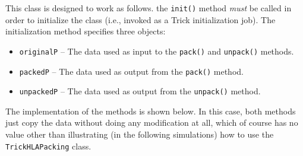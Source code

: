 This class is designed to work as follows.
the {\tt init()} method {\em must} be called in order to initialize the class
(i.e., invoked as a Trick initialization job).
The initialization method specifies three \simplesine objects:
\begin{itemize}
\item{{\tt originalP} --
  The \simplesine data used as input to the {\tt pack()} and {\tt unpack()}
  methods.
}
\item{{\tt packedP} --
  The \simplesine data used as output from the {\tt pack()} method.
}
\item{{\tt unpackedP} --
  The \simplesine data used as output from the {\tt unpack()} method.
}
\end{itemize}

The implementation of the methods is shown below.
In this case, both methods just copy the data without doing any
modification at all, which of course has no value other than
illustrating (in the following simulations) how to use the
{\tt TrickHLAPacking} class.

